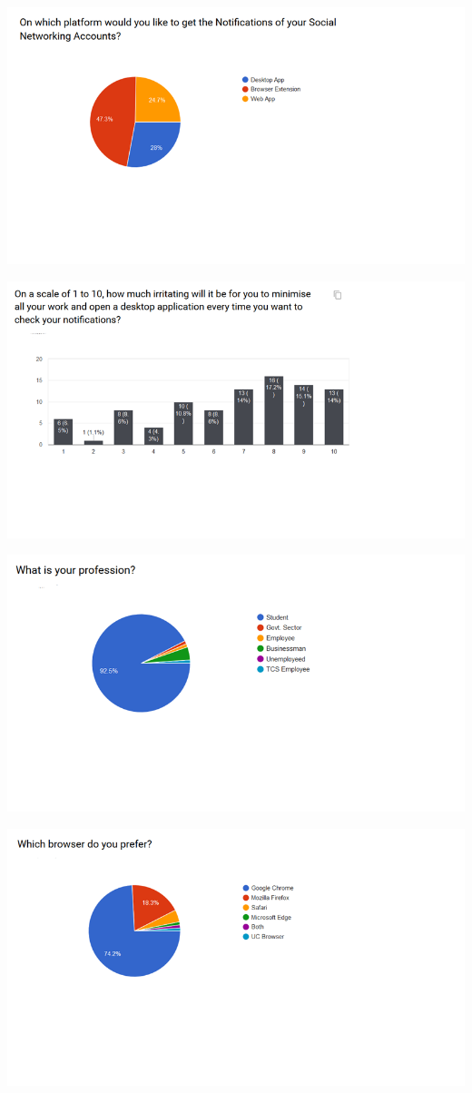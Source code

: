 \documentclass[12pt]{article}
\begin{document}
  \includegraphics[width=\linewidth]{srs10.png}
  
  \includegraphics[width=\linewidth]{srs11.png}
  
  \includegraphics[width=\linewidth]{srs12.png}
  
  \includegraphics[width=\linewidth]{srs13.png}
  
  
  
\end{document}
